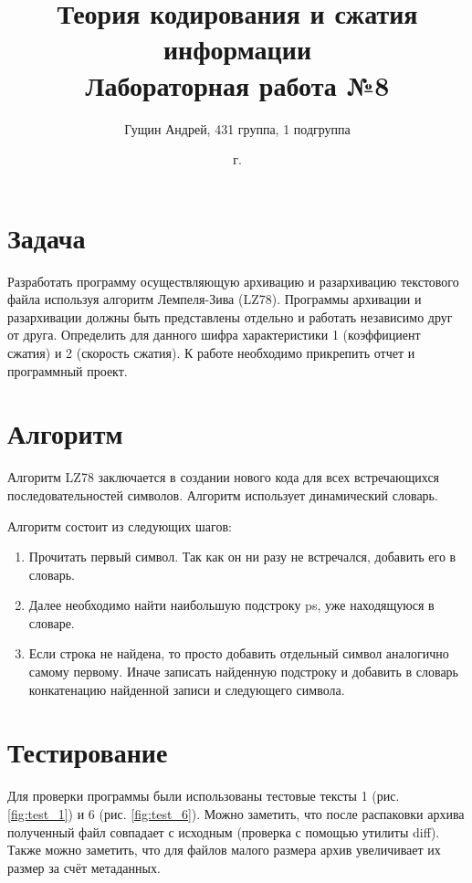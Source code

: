 \documentclass[a4paper,oneside]{article}
\title{{Теория кодирования и сжатия информации}\\{Лабораторная работа №8}}
\author{Гущин Андрей, 431 группа, 1 подгруппа}
\date{\the\year{} г.}
\theoremstyle{definition}
\begin{document}
\maketitle

\section{Задача}

Разработать программу осуществляющую архивацию и разархивацию текстового файла
используя алгоритм Лемпеля-Зива (LZ78). Программы архивации и разархивации
должны быть представлены отдельно и работать независимо друг от друга.
Определить для данного шифра характеристики 1 (коэффициент сжатия) и 2 (скорость
сжатия). К работе необходимо прикрепить отчет и программный проект.


\section{Алгоритм}

Алгоритм LZ78 заключается в создании нового кода для всех встречающихся
последовательностей символов. Алгоритм использует динамический словарь.

Алгоритм состоит из следующих шагов:
\begin{enumerate}

  \item
    Прочитать первый символ. Так как он ни разу не встречался, добавить его
    в словарь.
  \item
    Далее необходимо найти наибольшую подстроку ps, уже находящуюся в словаре.
  \item
    Если строка не найдена, то просто добавить отдельный символ аналогично
    самому первому. Иначе записать найденную подстроку и добавить в словарь
    конкатенацию найденной записи и следующего символа.
\end{enumerate}


\section{Тестирование}

Для проверки программы были использованы тестовые тексты 1 (рис.
\ref{fig:test_1}) и 6 (рис. \ref{fig:test_6}). Можно заметить, что после
распаковки архива полученный файл совпадает с исходным (проверка с помощью
утилиты diff). Также можно заметить, что для файлов малого размера архив
увеличивает их размер за счёт метаданных.
\end{document}
